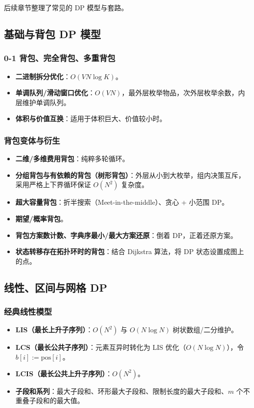 后续章节整理了常见的 DP 模型与套路。

\subsection{基础与背包 DP 模型}

\subsubsection{0-1 背包、完全背包、多重背包}
\begin{itemize}
    \item \textbf{二进制拆分优化}：$O(VN \log K)$。
    \item \textbf{单调队列/滑动窗口优化}：$O(VN)$，最外层枚举物品，次外层枚举余数，内层维护单调队列。
    \item \textbf{体积与价值互换}：适用于体积巨大、价值较小时。
\end{itemize}

\subsubsection{背包变体与衍生}
\begin{itemize}
    \item \textbf{二维/多维费用背包}：纯粹多轮循环。
    \item \textbf{分组背包与有依赖的背包（树形背包）}：外层从小到大枚举，组内决策互斥，采用严格上下界循环保证 $O(N^2)$ 复杂度。
    \item \textbf{超大容量背包}：折半搜索（Meet-in-the-middle）、贪心 + 小范围 DP。
    \item \textbf{期望/概率背包}。
    \item \textbf{背包方案数计数、字典序最小/最大方案还原}：倒着 DP，正着还原方案。
    \item \textbf{状态转移存在拓扑环时的背包}：结合 Dijkstra 算法，将 DP 状态设置成图上的点。
\end{itemize}


\subsection{线性、区间与网格 DP}

\subsubsection{经典线性模型}
\begin{itemize}
    \item \textbf{LIS（最长上升子序列）}：$O(N^2)$ 与 $O(N \log N)$ 树状数组/二分维护。
    \item \textbf{LCS（最长公共子序列）}：元素互异时转化为 LIS 优化（$O(N \log N)$），令 $b[i] := \mathrm{pos}[i]$。
    \item \textbf{LCIS（最长公共上升子序列）}：$O(N^2)$。
    \item \textbf{子段和系列}：最大子段和、环形最大子段和、限制长度的最大子段和、$m$ 个不重叠子段和的最大值。
\end{itemize}

